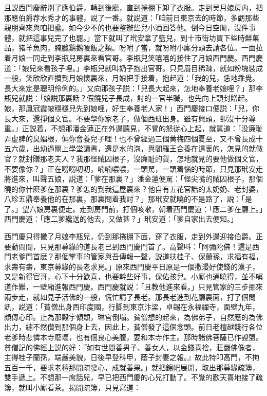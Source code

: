 且説西門慶辭別了應伯爵，轉到後廳，直到捲棚下卸了衣服。走到吴月娘房内，把那應伯爵荐水秀才的事體，説了一番。就説道：「咱前日東京去的時節，多虧那些親朋齊來與咱把盞。如今少不的也要整辦些兒小酒回答他。倒今日空閒，沒件事體，就把這事兒完了也罷。」當下就叫了玳安拿了籃兒，到十市街坊買下些時鮮菓品，猪羊魚肉，腌臘鷄鵝嗄飯之類。吩咐了當，就吩咐小廝分頭去請各位。一面拉着月娘一同走到李瓶兒房裏來看官哥。李瓶兒笑嘻嘻的接住了月娘西門慶。西門慶道：「娘兒來看孩子哩。」李瓶兒就叫奶子抱出官哥。只見眉目稀疎，就如粉塊裝成一般，笑欣欣直攢到月娘懷裏來，月娘把手接着，抱起道：「我的兒，恁地乖覺。長大來定是聰明伶俐的。」又向那孩子説：「兒長大起來，怎地奉養老娘哩？」那李瓶兒就説：「娘説那裏話？假饒兒子長成，討的一官半職，也先向上頭封贈起。娘，那鳳冠霞帔穩穩兒先到娘哩，好生奉養老人家！」西門慶接口便説：「兒，你長大來，還掙個文官。不要學你家老子，做個西班出身。雖有興頭，卻沒十分尊重。」正説着，不想那潘金蓮正在外邊聽見，不覺的怒従心上起，就駡道：「没廉耻弄虚脾的臭娼根，偏你會養兒子哩！也不曾經過三個黄梅四個夏至，又不曾長成十五六歲，出幼過關上學堂讀書，還是水的泡，與閻羅王合養在這裏的，怎見的就做官？就封贈那老夫人？我那怪賊囚根子，沒廉耻的貨，怎地就見的要他做個文官，不要像你？」正在嘮嘮叨叨，喃喃噥噥，一頭駡，一頭着惱的時節，只見那玳安走將進來，叫聲五娘，説道：「爹在那裏？」潘金蓮便駡：「怪尖嘴的賊囚根子，那個曉的你什麽爹在那裏？爹怎的到我這屋裏來？他自有五花官誥的太奶奶、老封婆，八珍五鼎奉養他的在那裏，那裏問着我討？」那玳安就曉的不是路了，説：「是了。」望六娘房裏便走。走到房門前，打個咳嗽，朝着西門慶道：「應二爹在廳上。」西門慶道：「應二爹纔送的他去，又做甚？」玳安道：「爹自家出去便知。」

西門慶只得撇了月娘李瓶兒，仍到那捲棚下面，穿了衣服，走到外邊迎接伯爵。正要動問間，只見那募緣的道長老已到西門慶門首了。高聲呌：「阿彌陀佛！這是西門老爹門首麽？那個掌事的管家與吾傳報一聲，説道扶桂子、保蘭孫，求福有福，求壽有壽，東京募緣的長老求見。」原來西門慶平日原是一個撒漫好使錢的漢子，又是新得官哥，心下十分歡喜，也要幹些好事，保佑孩兒。小廝也通曉得，並不嗔道作難，一壁廂進報西門慶。西門慶就説：「且教他進來看。」只見管家的三步挪來兩步走，就如見子活佛的一般，慌忙請了長老。那長老進到花廳裏面，打了個問訊，説道：「貧僧出身西印度國，行脚到東京汴梁，卓錫在永福禪寺，面壁九年，頗傳心印。止為那殿宇傾頽，琳宫倒塌。貧僧想的起來，為佛弟子，自然應的為佛出力，總不然儹到那個身上去，因此上，貧僧發了這個念頭。前日老檀越餞行各位老爹時悲憐本寺廢壞，也有個良心美腹，要和本寺作主。那時諸佛菩薩已作證盟。貧僧記的佛經上説的好：『如有世間善男子、善女人，以金錢喜捨，莊嚴佛像者，主得桂子蘭孫，端嚴美貌，日後早登科甲，蔭子封妻之報。』故此特叩高門，不拘五百一千，要求老檀那開疏發心，成就善果。」就把錦帊展開，取出那募緣疏簿，雙手遞上。不想那一席話兒，早已把西門慶的心兒打動了。不覺的歡天喜地接了疏簿，就叫小廝看茶。揭開疏簿，只見寫道：

